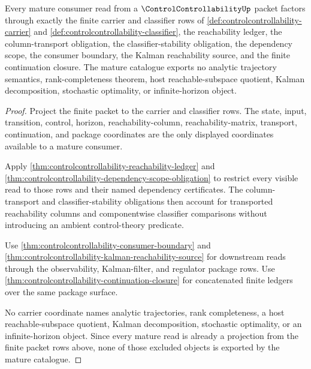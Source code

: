 \begin{theorem}
\label{thm:controlcontrollability-mature-consumer-coverage}
Every mature consumer read from a $\ControlControllabilityUp$ packet factors through exactly the finite carrier and classifier rows of \autoref{def:controlcontrollability-carrier} and \autoref{def:controlcontrollability-classifier}, the reachability ledger, the column-transport obligation, the classifier-stability obligation, the dependency scope, the consumer boundary, the Kalman reachability source, and the finite continuation closure. The mature catalogue exports no analytic trajectory semantics, rank-completeness theorem, host reachable-subspace quotient, Kalman decomposition, stochastic optimality, or infinite-horizon object.
\end{theorem}
\begin{proof}
Project the finite packet to the carrier and classifier rows. The state, input, transition, control, horizon, reachability-column, reachability-matrix, transport, continuation, and package coordinates are the only displayed coordinates available to a mature consumer.

Apply \autoref{thm:controlcontrollability-reachability-ledger} and \autoref{thm:controlcontrollability-dependency-scope-obligation} to restrict every visible read to those rows and their named dependency certificates. The column-transport and classifier-stability obligations then account for transported reachability columns and componentwise classifier comparisons without introducing an ambient control-theory predicate.

Use \autoref{thm:controlcontrollability-consumer-boundary} and \autoref{thm:controlcontrollability-kalman-reachability-source} for downstream reads through the observability, Kalman-filter, and regulator package rows. Use \autoref{thm:controlcontrollability-continuation-closure} for concatenated finite ledgers over the same package surface.

No carrier coordinate names analytic trajectories, rank completeness, a host reachable-subspace quotient, Kalman decomposition, stochastic optimality, or an infinite-horizon object. Since every mature read is already a projection from the finite packet rows above, none of those excluded objects is exported by the mature catalogue.
\end{proof}

